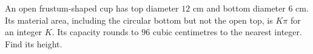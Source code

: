 An open frustum-shaped cup has top diameter $12$ cm and bottom diameter $6$ cm. Its material area, including the circular bottom but not the open top, is $K\pi$ for an integer $K$. Its capacity rounds to $96$ cubic centimetres to the nearest integer. Find its height.
